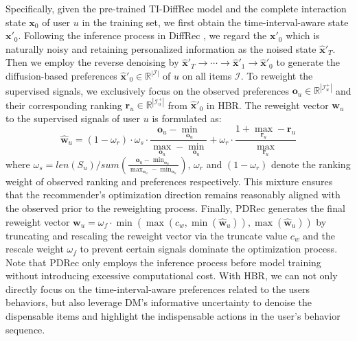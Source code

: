 \documentclass[letterpaper]{article} %
\begin{document}
Specifically, given the pre-trained TI-DiffRec model and the complete interaction state $\bm{x}_{0}$ of user $u$ in the training set, we first obtain the time-interval-aware state $\bm{x'}_{0}$.
Following the inference process in DiffRec \cite{DiffRec}, we regard the $\bm{x'}_{0}$ which is naturally noisy and retaining personalized information as the noised state $\bm{\hat{x}'}_{T}$.
Then we employ the reverse denoising by $\bm{\hat{x}'}_{T}\!\rightarrow\!\cdots\!\rightarrow\!\bm{\hat{x}'}_{1}\!\rightarrow\!\bm{\hat{x}'}_{0}$ to generate the diffusion-based preferences $\bm{\hat{x}'}_{0}\!\in\!\mathbb{R}^{|\mathcal{I}|}$ of $u$ on all items $\mathcal{I}$. To reweight the supervised signals, we exclusively focus on the observed preferences $\bm{o}_{u}\!\in\!\mathbb{R}^{|\mathcal{I}^{+}_u|}$ and their corresponding ranking $\bm{r}_{u}\!\in\!\mathbb{R}^{|\mathcal{I}^{+}_u|}$ from $\bm{\hat{x}'}_{0}$ in HBR. The reweight vector $\bm{w}_u$ to the supervised signals of user $u$ is formulated as:
\begin{equation}
    \bm{\hat{w}}_u\!=\!(1\!-\!\omega_r)\cdot\omega_s\cdot\frac{\bm{o}_{u}\!-\!\min_{\bm{o}_{u}}}{\max_{\bm{o}_{u}}\!-\!\min_{\bm{o}_{u}}}+\omega_r\!\cdot\!\frac{1\!+\!\max_{\bm{r}_{u}}\!-\!\bm{r}_{u}}{\max_{\bm{r}_{u}}}
\end{equation}
where $\omega_s\!=\!len(S_{u})\!/\!sum(\frac{\bm{o}_{u}\!-\!\min_{\bm{o}_{u}}}{\max_{\bm{o}_{u}}\!-\!\min_{\bm{o}_{u}}})$, $\omega_r$ and $(1\!-\!\omega_r)$ denote the ranking weight of observed ranking and preferences respectively.
This mixture ensures that the recommender's optimization direction remains reasonably aligned with the observed prior to the reweighting process. Finally, PDRec generates the final reweight vector $\bm{w}_u = \omega_f\cdot\min(\max(c_w, \min(\bm{\hat{w}}_u)), \max(\bm{\hat{w}}_u))$ by truncating and rescaling the reweight vector via the truncate value $c_w$ and the rescale weight $\omega_f$ to prevent certain signals dominate the optimization process. Note that PDRec only employs the inference process before model training without introducing excessive computational cost. With HBR, we can not only directly focus on the time-interval-aware preferences related to the users behaviors, but also leverage DM's informative uncertainty to denoise the dispensable items and highlight the indispensable actions in the user's behavior sequence.
\end{document}
